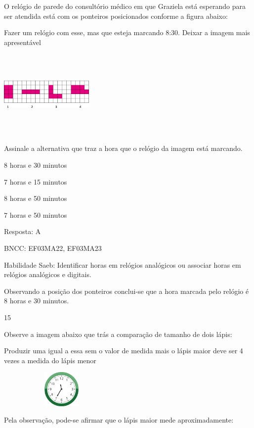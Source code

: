 \begin{escolha}
{\begin{escolha}
{O relógio de parede do consultório médico em que Graziela está esperando
para ser atendida está com os ponteiros posicionados conforme a figura
abaixo:

Fazer um relógio com esse, mas que esteja marcando 8:30. Deixar a imagem
mais apresentável

\includegraphics[width=1.79182in,height=1.69181in]{media/image115.png}

Assinale a alternativa que traz a hora que o relógio da imagem está
marcando.

\begin{escolha}
\item
  8 horas e 30 minutos
\item
  7 horas e 15 minutos
\item
  8 horas e 50 minutos
\item
  7 horas e 50 minutos
\end{escolha}

Resposta: A

BNCC: EF03MA22, EF03MA23

Habilidade Saeb: Identificar horas em relógios analógicos ou associar
horas em relógios analógicos e digitais.

Observando a posição dos ponteiros conclui-se que a hora marcada pelo
relógio é 8 horas e 30 minutos.

\num{15}

Observe a imagem abaixo que trás a comparação de tamanho de dois lápis:

Produzir uma igual a essa sem o valor de medida mais o lápis maior deve
ser 4 vezes a medida do lápis menor

\includegraphics[width=2.43137in,height=0.71356in]{media/image116.png}

Pela observação, pode-se afirmar que o lápis maior mede aproximadamente:

}
\end{escolha}}
\end{escolha}
